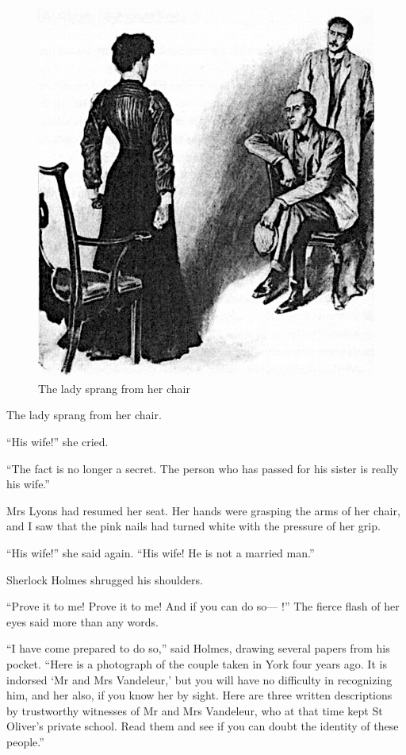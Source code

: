 \documentclass[paper=a5,BCOR=7mm,twoside,DIV=calc,12pt,usegeometry,openany,chapterprefix,endperiod,headings=big]{scrbook} %
\begin{document}
\begin{figure}[tbh]
\centering
\includegraphics[width=.7\linewidth]{13_sprang}
\caption{The lady sprang from her chair}
\end{figure}

The lady sprang from her chair.

\enquote{His wife!} she cried.

\enquote{The fact is no longer a secret. The person who has passed for his sister is really his wife.}

Mrs Lyons had resumed her seat. Her hands were grasping the arms of her chair, and I saw that the pink nails had turned white with the pressure of her grip.

\enquote{His wife!} she said again. \enquote{His wife! He is not a married man.}

Sherlock Holmes shrugged his shoulders.

\enquote{Prove it to me! Prove it to me! And if you can do so--- !} The fierce flash of her eyes said more than any words.


\enquote{I have come prepared to do so,} said Holmes, drawing several papers from his pocket. \enquote{Here is a photograph of the couple taken in York four years ago. It is indorsed \enquote{Mr and Mrs Vandeleur,} but you will have no difficulty in recognizing him, and her also, if you know her by sight. Here are three written descriptions by trustworthy witnesses of Mr and Mrs Vandeleur, who at that time kept St Oliver's private school. Read them and see if you can doubt the identity of these people.}
\end{document}
